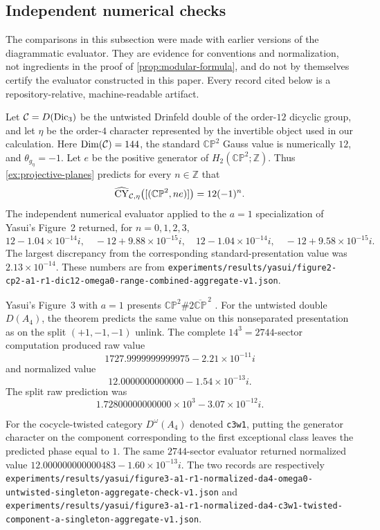 \subsection{Independent numerical checks}
\label{app:numerical-checks}

The comparisons in this subsection were made with earlier versions of the
diagrammatic evaluator.  They are evidence for conventions and normalization,
not ingredients in the proof of \cref{prop:modular-formula}, and do not by
themselves certify the evaluator constructed in this paper.  Every
record cited below is a repository-relative, machine-readable artifact.

\begin{example}
\label{ex:dic3-cp2-numerical}
Let \(\mathcal{C}=D(\mathrm{Dic}_3)\) be the untwisted Drinfeld double of the
order-$12$ dicyclic group, and let \(\eta\) be the order-$4$ character
represented by the invertible object used in our calculation.  Here
$\operatorname{Dim}(\mathcal{C})=144$, the standard
$\mathbb{CP}^2$ Gauss value is numerically $12$, and
$\theta_{g_\eta}=-1$.  Let \(e\) be the positive generator of
\(H_2(\mathbb{CP}^2;\mathbb Z)\).  Thus \cref{ex:projective-planes} predicts
for every \(n\in\mathbb Z\) that
\[
 \widehat{\operatorname{CY}}_{\mathcal{C},\eta}\bigl([(\mathbb{CP}^2,ne)]\bigr)=12(-1)^n.
\]
The independent numerical evaluator applied to the $a=1$ specialization of
Yasui's Figure~2 \cite{Yasui2008} returned, for $n=0,1,2,3$,
\[
 12-1.04\!\times\!10^{-14}i,
 \quad -12+9.88\!\times\!10^{-15}i,
 \quad 12-1.04\!\times\!10^{-14}i,
 \quad -12+9.58\!\times\!10^{-15}i.
\]
The largest discrepancy from the corresponding standard-presentation value
was $2.13\times10^{-14}$.  These numbers are from
\nolinkurl{experiments/results/yasui/figure2-cp2-a1-r1-dic12-omega0-range-combined-aggregate-v1.json}.
\end{example}

\begin{example}
\label{ex:da4-yasui-a1}
Yasui's Figure~3 with $a=1$ presents
$\mathbb{CP}^2\#2\overline{\mathbb{CP}}^{\,2}$ \cite{Yasui2008}.  For the
untwisted double $D(A_4)$, the theorem predicts the same value on this
nonseparated presentation as on the split $(+1,-1,-1)$ unlink.  The complete
$14^3=2744$-sector computation produced raw value
\[
 1727.9999999999975-2.21\times10^{-11}i
\]
and normalized value
\[
 12.0000000000000-1.54\times10^{-13}i.
\]
The split raw prediction was
\[
 1.72800000000000\times10^3-3.07\times10^{-12}i.
\]

For the cocycle-twisted category $D^{\omega}(A_4)$ denoted \texttt{c3w1},
putting the generator character on the component corresponding to the first
exceptional class leaves the predicted phase equal to $1$.  The same
$2744$-sector evaluator returned normalized value
$12.000000000000483-1.60\times10^{-13}i$.  The two records are respectively
\nolinkurl{experiments/results/yasui/figure3-a1-r1-normalized-da4-omega0-untwisted-singleton-aggregate-check-v1.json}
and
\nolinkurl{experiments/results/yasui/figure3-a1-r1-normalized-da4-c3w1-twisted-component-a-singleton-aggregate-v1.json}.
\end{example}

